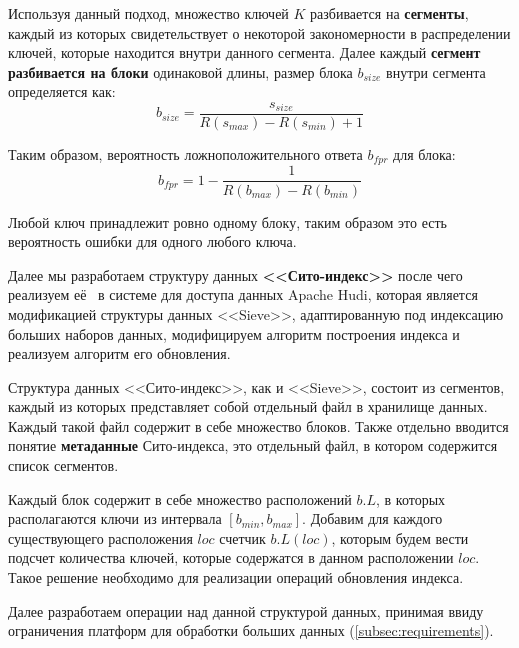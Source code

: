 Используя данный подход, множество ключей $K$ разбивается на \textbf{сегменты}, каждый из которых свидетельствует о некоторой закономерности в распределении ключей, которые находится внутри данного сегмента. Далее каждый \textbf{сегмент разбивается на блоки} одинаковой длины, размер блока $b_{size}$ внутри сегмента определяется как:
\begin{equation}\label{eq:partition_size}
    b_{size} = \frac{s_{size}}{R(s_{max}) - R(s_{min}) + 1}
\end{equation}

Таким образом, вероятность ложноположительного ответа $b_{fpr}$ для блока:
\begin{equation}\label{eq:partition_fpr}
    b_{fpr} = 1 - \frac{1}{R(b_{max}) - R(b_{min})}
\end{equation}

Любой ключ принадлежит ровно одному блоку, таким образом это есть вероятность ошибки для одного любого ключа.

Далее мы разработаем структуру данных \textbf{<<Сито-индекс>>} после чего реализуем её~\cite{Sieve_Github} в системе для доступа данных Apache Hudi, которая является модификацией структуры данных {<<Sieve>>}, адаптированную под индексацию больших наборов данных, модифицируем алгоритм построения индекса и реализуем алгоритм его обновления.

Структура данных {<<Сито-индекс>>}, как и {<<Sieve>>}, состоит из сегментов, каждый из которых представляет собой отдельный файл в хранилище данных. Каждый такой файл содержит в себе множество блоков. Также отдельно вводится понятие \textbf{метаданные} Сито-индекса, это отдельный файл, в котором содержится список сегментов.

Каждый блок содержит в себе множество расположений $b.L$, в которых располагаются ключи из интервала $[b_{min}, b_{max}]$. Добавим для каждого существующего расположения $loc$ счетчик $b.L(loc)$, которым будем вести подсчет количества ключей, которые содержатся в данном расположении $loc$. Такое решение необходимо для реализации операций обновления индекса.

Далее разработаем операции над данной структурой данных, принимая ввиду ограничения платформ для обработки больших данных (\ref{subsec:requirements}).

